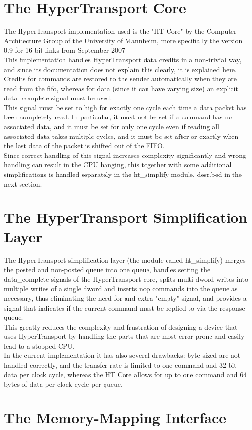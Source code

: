 \section{The HyperTransport Core}

The HyperTransport implementation used is the "HT Core" by the Computer
Architecture Group of the University of Mannheim, more specifially the
version 0.9 for 16-bit links from September 2007.\\
This implementation handles HyperTransport data credits in a non-trivial
way, and since its documentation does not explain this clearly, it is
explained here.\\
Credits for commands are restored to the sender automatically when they are
read from the fifo, whereas for data (since it can have varying size) an
explicit data\_complete signal must be used.\\
This signal must be set to high for exactly one cycle each time a data packet
has been completely read. In particular, it must not be set if a command
has no associated data, and it must be set for only one cycle even if reading
all associated data takes multiple cycles, and it must be set after or
exactly when the last data of the packet is shifted out of the FIFO.\\
Since correct handling of this signal increases complexity significantly
and wrong handling can result in the CPU hanging, this together with some
additional simplifications is handled separately in the ht\_simplify module,
desribed in the next section.

\section{The HyperTransport Simplification Layer}

The HyperTransport simplification layer (the module called ht\_simplify)
merges the posted and non-posted queue into one queue, handles setting
the data\_complete signals of the HyperTransport core, splits multi-dword
writes into multiple writes of a single dword and inserts nop
commands into the queue as necessary, thus eliminating the need for
and extra "empty" signal, and provides a signal that indicates
if the current command must be replied to via the response queue.\\
This greatly reduces the complexity and frustration of designing a device
that uses HyperTransport by handling the parts that are most error-prone
and easily lead to a stopped CPU.\\
In the current implementation it has also several drawbacks: byte-sized
are not handled correctly, and the transfer rate is limited to one command
and 32 bit data per clock cycle, whereas the HT Core allows for up to one
command and 64 bytes of data per clock cycle per queue.\\

\section{The Memory-Mapping Interface}

